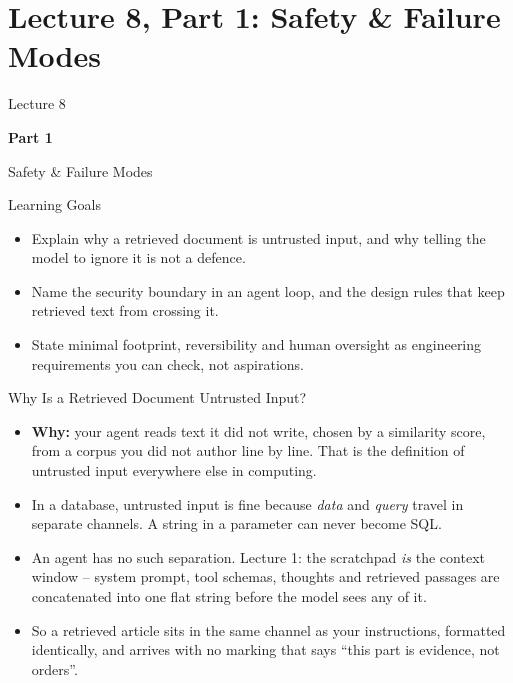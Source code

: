 \section{Lecture 8, Part 1: Safety \& Failure Modes}

\begin{frame}
\vfill
\centering
{\color{RLBlue}\large Lecture 8}

\vspace{0.3em}
{\color{RLBlue}\Large\bfseries Part 1}

\vspace{0.6em}
{\Large Safety \& Failure Modes}
\vfill
\end{frame}

\begin{frame}{Learning Goals}
\begin{itemize}
  \item Explain why a retrieved document is untrusted input, and why telling the model to ignore it is not a defence.
  \pause
  \item Name the security boundary in an agent loop, and the design rules that keep retrieved text from crossing it.
  \pause
  \item State minimal footprint, reversibility and human oversight as engineering requirements you can check, not aspirations.
\end{itemize}
\end{frame}

\begin{frame}{Why Is a Retrieved Document Untrusted Input?}
\begin{itemize}
  \item \textbf{Why:} your agent reads text it did not write, chosen by a similarity score, from a corpus you did not author line by line. That is the definition of untrusted input everywhere else in computing.
  \pause
  \item In a database, untrusted input is fine because \emph{data} and \emph{query} travel in separate channels. A string in a parameter can never become SQL.
  \pause
  \item An agent has no such separation. Lecture 1: the scratchpad \emph{is} the context window -- system prompt, tool schemas, thoughts and retrieved passages are concatenated into one flat string before the model sees any of it.
  \pause
  \item So a retrieved article sits in the same channel as your instructions, formatted identically, and arrives with no marking that says ``this part is evidence, not orders''.
\end{itemize}
\end{frame}

